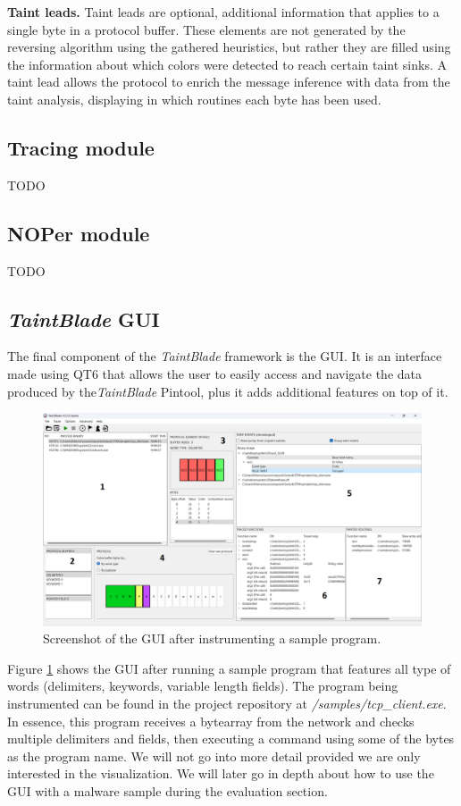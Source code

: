 \documentclass[conference]{IEEEtran}
\begin{document}
\textbf{Taint leads.} Taint leads are optional, additional information that applies to a single byte in a protocol buffer.
These elements are not generated by the reversing algorithm using the gathered heuristics, but rather
they are filled using the information about which colors were detected to reach certain taint sinks.
A taint lead allows the protocol to enrich the message inference with data from the taint analysis,
displaying in which routines each byte has been used.


\subsection{Tracing module}
TODO

\subsection{NOPer module}
TODO

\subsection{\textit{TaintBlade} GUI}
The final component of the \textit{TaintBlade} framework is the GUI. It is 
an interface made using QT6 that allows the user to easily access and navigate 
the data produced by the\textit{TaintBlade} Pintool, plus it adds additional 
features on top of it.

\begin{figure}[htbp]
    \centerline{\includegraphics[width=1.0\columnwidth]{images/GUI_full.png}}
    \caption{Screenshot of the GUI after instrumenting a sample program.}
    \label{figure:gui_full}
\end{figure}

Figure \ref{figure:gui_full} shows the GUI after running a sample program that features all type
of words (delimiters, keywords, variable length fields). The program being instrumented can be found in the project
repository at \textit{/samples/tcp\_client.exe}. In essence, this program receives a bytearray
from the network and checks multiple delimiters and fields, then executing a command using
some of the bytes as the program name. We will not go into more detail provided we are only
interested in the visualization. We will later go in depth about how to use the GUI with a
malware sample during the evaluation section.
\end{document}
